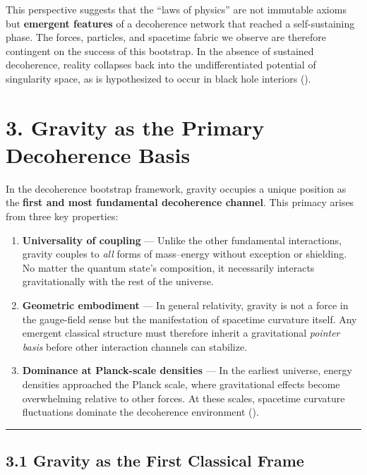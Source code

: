 \documentclass[
]{article}
\begin{document}
This perspective suggests that the ``laws of physics'' are not immutable
axioms but \textbf{emergent features} of a decoherence network that
reached a self-sustaining phase. The forces, particles, and spacetime
fabric we observe are therefore contingent on the success of this
bootstrap. In the absence of sustained decoherence, reality collapses
back into the undifferentiated potential of singularity space, as is
hypothesized to occur in black hole interiors
().

\section{3. Gravity as the Primary Decoherence
Basis}\label{gravity-as-the-primary-decoherence-basis}

In the decoherence bootstrap framework, gravity occupies a unique
position as the \textbf{first and most fundamental decoherence channel}.
This primacy arises from three key properties:

\begin{enumerate}
\def\labelenumi{\arabic{enumi}.}
\item
  \textbf{Universality of coupling} --- Unlike the other fundamental
  interactions, gravity couples to \emph{all} forms of mass--energy
  without exception or shielding. No matter the quantum state's
  composition, it necessarily interacts gravitationally with the rest of
  the universe.
\item
  \textbf{Geometric embodiment} --- In general relativity, gravity is
  not a force in the gauge-field sense but the manifestation of
  spacetime curvature itself. Any emergent classical structure must
  therefore inherit a gravitational \emph{pointer basis} before other
  interaction channels can stabilize.
\item
  \textbf{Dominance at Planck-scale densities} --- In the earliest
  universe, energy densities approached the Planck scale, where
  gravitational effects become overwhelming relative to other forces. At
  these scales, spacetime curvature fluctuations dominate the
  decoherence environment ().
\end{enumerate}

\begin{center}\rule{0.5\linewidth}{0.5pt}\end{center}

\subsection{3.1 Gravity as the First Classical
Frame}\label{gravity-as-the-first-classical-frame}
\end{document}
